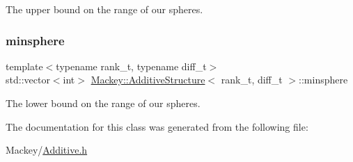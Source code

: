 The upper bound on the range of our spheres. 

\mbox{\label{classMackey_1_1AdditiveStructure_a1158af906d8bb5b9dcc7eed72367f25e}} 
\subsubsection{\texorpdfstring{minsphere}{minsphere}}
{\footnotesize\ttfamily template$<$typename rank\+\_\+t, typename diff\+\_\+t$>$ \\
std\+::vector$<$int$>$ \hyperlink{classMackey_1_1AdditiveStructure}{Mackey\+::\+Additive\+Structure}$<$ rank\+\_\+t, diff\+\_\+t $>$\+::minsphere}



The lower bound on the range of our spheres. 



The documentation for this class was generated from the following file\+:\begin{DoxyCompactItemize}
\item 
Mackey/\hyperlink{Additive_8h}{Additive.\+h}\end{DoxyCompactItemize}
